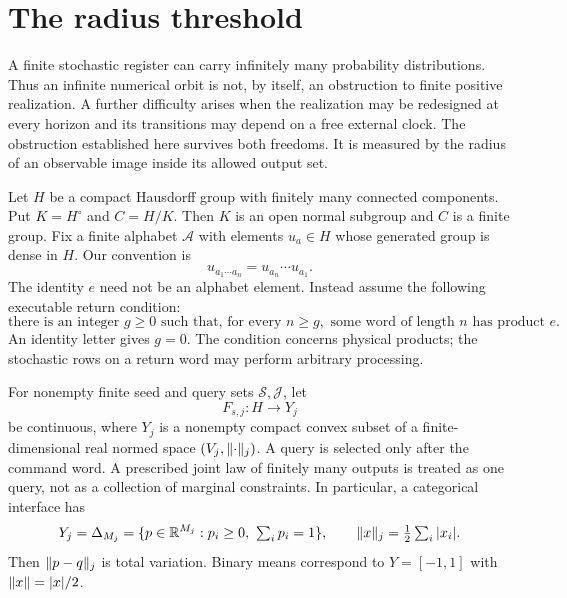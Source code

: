 \section{The radius threshold}\label{sec:intro54}
A finite stochastic register can carry infinitely many probability distributions. Thus an infinite numerical orbit is not, by itself, an obstruction to finite positive realization. A further difficulty arises when the realization may be redesigned at every horizon and its transitions may depend on a free external clock. The obstruction established here survives both freedoms. It is measured by the radius of an observable image inside its allowed output set.

Let $H$ be a compact Hausdorff group with finitely many connected components. Put $K=H^\circ$ and $C=H/K$. Then $K$ is an open normal subgroup and $C$ is a finite group. Fix a finite alphabet $\mathcal A$ with elements $u_a\in H$ whose generated group is dense in $H$. Our convention is
\[
 u_{a_1\cdots a_n}=u_{a_n}\cdots u_{a_1}.
\]
The identity $e$ need not be an alphabet element. Instead assume the following executable return condition:
\begin{equation}\label{eq:returns54}
 \text{there is an integer }g\ge0\text{ such that, for every }n\ge g,
 \text{ some word of length }n\text{ has product }e.
\end{equation}
An identity letter gives $g=0$. The condition concerns physical products; the stochastic rows on a return word may perform arbitrary processing.

For nonempty finite seed and query sets $\mathcal S,\mathcal J$, let
\[
 F_{s,j}:H\longrightarrow Y_j
\]
be continuous, where $Y_j$ is a nonempty compact convex subset of a finite-dimensional real normed space $(V_j,\lVert \cdot\rVert_j)$. A query is selected only after the command word. A prescribed joint law of finitely many outputs is treated as one query, not as a collection of marginal constraints. In particular, a categorical interface has
\[
 Y_j=\Delta_{M_j}=\{p\in\R^{M_j}:p_i\ge0,\ \textstyle\sum_i p_i=1\},
 \qquad \norm{x}_j=\tfrac12\sum_i|x_i|.
\]
Then $\lVert p-q\rVert_j$ is total variation. Binary means correspond to $Y=[-1,1]$ with $\lVert x\rVert=|x|/2$.

